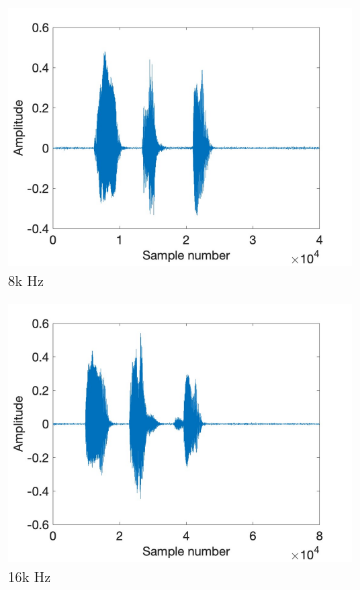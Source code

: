 \documentclass[11pt, oneside]{article}   	%
\begin{document}
\begin{figure}[ht]
\centering
\begin{subfigure}[b]{0.3\textwidth}
\includegraphics[width=\textwidth]{imgs/8k-amplitude.jpg}
\caption{8k Hz}
\end{subfigure}
\begin{subfigure}[b]{0.3\textwidth}
\includegraphics[width=\textwidth]{imgs/16k-amplitude.jpg}
\caption{16k Hz}
\end{subfigure}
\begin{subfigure}[b]{0.3\textwidth}

\end{subfigure}
\end{figure}
\end{document}
